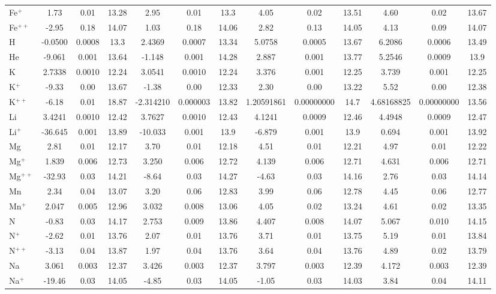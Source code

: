 \begin{longtable}{l!{\vrule width 0.25pt}ccc!{\vrule width 0.25pt}ccc!{\vrule width 0.25pt}ccc!{\vrule width 0.25pt}ccc}
Fe$^+$ & 1.73 & 0.01 & 13.28 & 2.95 & 0.01 & 13.3 & 4.05 & 0.02 & 13.51 & 4.60 & 0.02 & 13.67 \\
Fe$^{++}$ & -2.95 & 0.18 & 14.07 & 1.03 & 0.18 & 14.06 & 2.82 & 0.13 & 14.05 & 4.13 & 0.09 & 14.07 \\
H & -0.0500 & 0.0008 & 13.3 & 2.4369 & 0.0007 & 13.34 & 5.0758 & 0.0005 & 13.67 & 6.2086 & 0.0006 & 13.49 \\
He & -9.061 & 0.001 & 13.64 & -1.148 & 0.001 & 14.28 & 2.887 & 0.001 & 13.77 & 5.2546 & 0.0009 & 13.9 \\
K & 2.7338 & 0.0010 & 12.24 & 3.0541 & 0.0010 & 12.24 & 3.376 & 0.001 & 12.25 & 3.739 & 0.001 & 12.25 \\
K$^+$ & -9.33 & 0.00 & 13.67 & -1.38 & 0.00 & 12.33 & 2.30 & 0.00 & 13.22 & 5.52 & 0.00 & 12.38 \\
K$^{++}$ & -6.18 & 0.01 & 18.87 & -2.314210 & 0.000003 & 13.82 & 1.20591861 & 0.00000000 & 14.7 & 4.68168825 & 0.00000000 & 13.56 \\
Li & 3.4241 & 0.0010 & 12.42 & 3.7627 & 0.0010 & 12.43 & 4.1241 & 0.0009 & 12.46 & 4.4948 & 0.0009 & 12.47 \\
Li$^+$ & -36.645 & 0.001 & 13.89 & -10.033 & 0.001 & 13.9 & -6.879 & 0.001 & 13.9 & 0.694 & 0.001 & 13.92 \\
Mg & 2.81 & 0.01 & 12.17 & 3.70 & 0.01 & 12.18 & 4.51 & 0.01 & 12.21 & 4.97 & 0.01 & 12.22 \\
Mg$^+$ & 1.839 & 0.006 & 12.73 & 3.250 & 0.006 & 12.72 & 4.139 & 0.006 & 12.71 & 4.631 & 0.006 & 12.71 \\
Mg$^{++}$ & -32.93 & 0.03 & 14.21 & -8.64 & 0.03 & 14.27 & -4.63 & 0.03 & 14.16 & 2.76 & 0.03 & 14.14 \\
Mn & 2.34 & 0.04 & 13.07 & 3.20 & 0.06 & 12.83 & 3.99 & 0.06 & 12.78 & 4.45 & 0.06 & 12.77 \\
Mn$^+$ & 2.047 & 0.005 & 12.96 & 3.032 & 0.008 & 13.06 & 4.05 & 0.02 & 13.24 & 4.61 & 0.02 & 13.35 \\
N & -0.83 & 0.03 & 14.17 & 2.753 & 0.009 & 13.86 & 4.407 & 0.008 & 14.07 & 5.067 & 0.010 & 14.15 \\
N$^+$ & -2.62 & 0.01 & 13.76 & 2.07 & 0.01 & 13.76 & 3.71 & 0.01 & 13.75 & 5.19 & 0.01 & 13.84 \\
N$^{++}$ & -3.13 & 0.04 & 13.87 & 1.97 & 0.04 & 13.76 & 3.64 & 0.04 & 13.76 & 4.89 & 0.02 & 13.79 \\
Na & 3.061 & 0.003 & 12.37 & 3.426 & 0.003 & 12.37 & 3.797 & 0.003 & 12.39 & 4.172 & 0.003 & 12.39 \\
Na$^+$ & -19.46 & 0.03 & 14.05 & -4.85 & 0.03 & 14.05 & -1.05 & 0.03 & 14.03 & 3.84 & 0.04 & 14.11 \\

\end{longtable}

